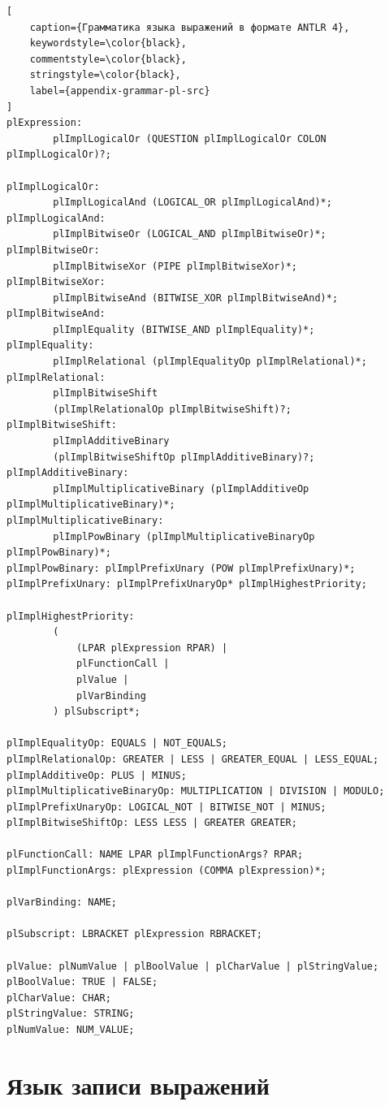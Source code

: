 \documentclass[times,specification,annotation]{style/itmo-student-thesis/itmo-student-thesis}
\begin{document}
\begin{lstlisting}[
    caption={Грамматика языка выражений в формате ANTLR 4},
    keywordstyle=\color{black},
    commentstyle=\color{black},
    stringstyle=\color{black},
    label={appendix-grammar-pl-src}
]
plExpression:
        plImplLogicalOr (QUESTION plImplLogicalOr COLON plImplLogicalOr)?;

plImplLogicalOr:
        plImplLogicalAnd (LOGICAL_OR plImplLogicalAnd)*;
plImplLogicalAnd:
        plImplBitwiseOr (LOGICAL_AND plImplBitwiseOr)*;
plImplBitwiseOr:
        plImplBitwiseXor (PIPE plImplBitwiseXor)*;
plImplBitwiseXor:
        plImplBitwiseAnd (BITWISE_XOR plImplBitwiseAnd)*;
plImplBitwiseAnd:
        plImplEquality (BITWISE_AND plImplEquality)*;
plImplEquality:
        plImplRelational (plImplEqualityOp plImplRelational)*;
plImplRelational:
        plImplBitwiseShift
        (plImplRelationalOp plImplBitwiseShift)?;
plImplBitwiseShift:
        plImplAdditiveBinary
        (plImplBitwiseShiftOp plImplAdditiveBinary)?;
plImplAdditiveBinary:
        plImplMultiplicativeBinary (plImplAdditiveOp plImplMultiplicativeBinary)*;
plImplMultiplicativeBinary:
        plImplPowBinary (plImplMultiplicativeBinaryOp plImplPowBinary)*;
plImplPowBinary: plImplPrefixUnary (POW plImplPrefixUnary)*;
plImplPrefixUnary: plImplPrefixUnaryOp* plImplHighestPriority;

plImplHighestPriority:
        (
            (LPAR plExpression RPAR) |
            plFunctionCall |
            plValue |
            plVarBinding
        ) plSubscript*;

plImplEqualityOp: EQUALS | NOT_EQUALS;
plImplRelationalOp: GREATER | LESS | GREATER_EQUAL | LESS_EQUAL;
plImplAdditiveOp: PLUS | MINUS;
plImplMultiplicativeBinaryOp: MULTIPLICATION | DIVISION | MODULO;
plImplPrefixUnaryOp: LOGICAL_NOT | BITWISE_NOT | MINUS;
plImplBitwiseShiftOp: LESS LESS | GREATER GREATER;

plFunctionCall: NAME LPAR plImplFunctionArgs? RPAR;
plImplFunctionArgs: plExpression (COMMA plExpression)*;

plVarBinding: NAME;

plSubscript: LBRACKET plExpression RBRACKET;

plValue: plNumValue | plBoolValue | plCharValue | plStringValue;
plBoolValue: TRUE | FALSE;
plCharValue: CHAR;
plStringValue: STRING;
plNumValue: NUM_VALUE;
\end{lstlisting}

\chapter{Язык записи выражений}\label{appendix-pl-operators-priority}
\end{document}
